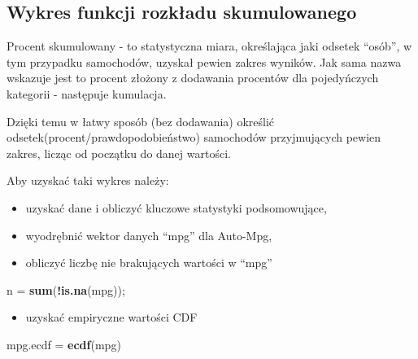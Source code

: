 \documentclass[
]{article}
\newenvironment{Shaded}{\begin{snugshade}}{\end{snugshade}}
\newcommand{\KeywordTok}[1]{\textcolor[rgb]{0.13,0.29,0.53}{\textbf{#1}}}
\newcommand{\NormalTok}[1]{#1}
\newcommand{\OperatorTok}[1]{\textcolor[rgb]{0.81,0.36,0.00}{\textbf{#1}}}
\newcommand{\StringTok}[1]{\textcolor[rgb]{0.31,0.60,0.02}{#1}}
\providecommand{\tightlist}{%
  \setlength{\itemsep}{0pt}\setlength{\parskip}{0pt}}
\begin{document}
\hypertarget{wykres-funkcji-rozkux142adu-skumulowanego}{%
\subsection{Wykres funkcji rozkładu
skumulowanego}\label{wykres-funkcji-rozkux142adu-skumulowanego}}

Procent skumulowany - to statystyczna miara, określająca jaki odsetek
``osób'', w tym przypadku samochodów, uzyskał pewien zakres wyników. Jak
sama nazwa wskazuje jest to procent złożony z dodawania procentów dla
pojedyńczych kategorii - następuje kumulacja.

Dzięki temu w łatwy sposób (bez dodawania) określić
odsetek(procent/prawdopodobieństwo) samochodów przyjmujących pewien
zakres, licząc od początku do danej wartości.

Aby uzyskać taki wykres należy:

\begin{itemize}
\item
  uzyskać dane i obliczyć kluczowe statystyki podsomowujące,
\item
  wyodrębnić wektor danych ``mpg'' dla Auto-Mpg,
\end{itemize}

\begin{Shaded}
\end{Shaded}

\begin{itemize}
\tightlist
\item
  obliczyć liczbę nie brakujących wartości w ``mpg''
\end{itemize}

\begin{Shaded}
\begin{Highlighting}[]
\NormalTok{n =}\StringTok{ }\KeywordTok{sum}\NormalTok{(}\OperatorTok{!}\KeywordTok{is.na}\NormalTok{(mpg));}
\end{Highlighting}
\end{Shaded}

\begin{itemize}
\tightlist
\item
  uzyskać empiryczne wartości CDF
\end{itemize}

\begin{Shaded}
\begin{Highlighting}[]
\NormalTok{mpg.ecdf =}\StringTok{ }\KeywordTok{ecdf}\NormalTok{(mpg)}
\end{Highlighting}
\end{Shaded}
\end{document}
